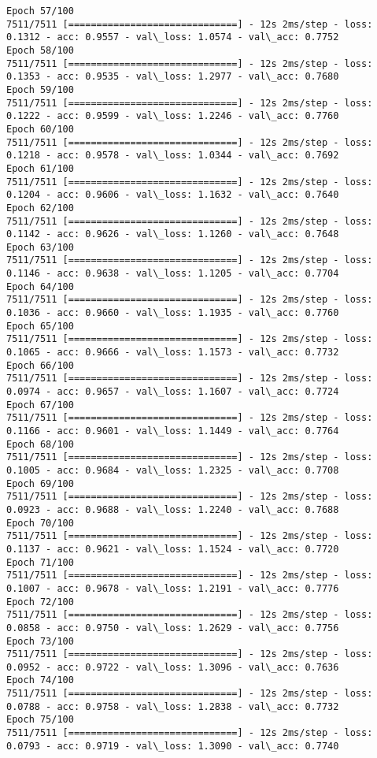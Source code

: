 \documentclass[11pt]{article}
\begin{document}
\begin{Verbatim}[commandchars=\\\{\}]
Epoch 57/100
7511/7511 [==============================] - 12s 2ms/step - loss: 0.1312 - acc: 0.9557 - val\_loss: 1.0574 - val\_acc: 0.7752
Epoch 58/100
7511/7511 [==============================] - 12s 2ms/step - loss: 0.1353 - acc: 0.9535 - val\_loss: 1.2977 - val\_acc: 0.7680
Epoch 59/100
7511/7511 [==============================] - 12s 2ms/step - loss: 0.1222 - acc: 0.9599 - val\_loss: 1.2246 - val\_acc: 0.7760
Epoch 60/100
7511/7511 [==============================] - 12s 2ms/step - loss: 0.1218 - acc: 0.9578 - val\_loss: 1.0344 - val\_acc: 0.7692
Epoch 61/100
7511/7511 [==============================] - 12s 2ms/step - loss: 0.1204 - acc: 0.9606 - val\_loss: 1.1632 - val\_acc: 0.7640
Epoch 62/100
7511/7511 [==============================] - 12s 2ms/step - loss: 0.1142 - acc: 0.9626 - val\_loss: 1.1260 - val\_acc: 0.7648
Epoch 63/100
7511/7511 [==============================] - 12s 2ms/step - loss: 0.1146 - acc: 0.9638 - val\_loss: 1.1205 - val\_acc: 0.7704
Epoch 64/100
7511/7511 [==============================] - 12s 2ms/step - loss: 0.1036 - acc: 0.9660 - val\_loss: 1.1935 - val\_acc: 0.7760
Epoch 65/100
7511/7511 [==============================] - 12s 2ms/step - loss: 0.1065 - acc: 0.9666 - val\_loss: 1.1573 - val\_acc: 0.7732
Epoch 66/100
7511/7511 [==============================] - 12s 2ms/step - loss: 0.0974 - acc: 0.9657 - val\_loss: 1.1607 - val\_acc: 0.7724
Epoch 67/100
7511/7511 [==============================] - 12s 2ms/step - loss: 0.1166 - acc: 0.9601 - val\_loss: 1.1449 - val\_acc: 0.7764
Epoch 68/100
7511/7511 [==============================] - 12s 2ms/step - loss: 0.1005 - acc: 0.9684 - val\_loss: 1.2325 - val\_acc: 0.7708
Epoch 69/100
7511/7511 [==============================] - 12s 2ms/step - loss: 0.0923 - acc: 0.9688 - val\_loss: 1.2240 - val\_acc: 0.7688
Epoch 70/100
7511/7511 [==============================] - 12s 2ms/step - loss: 0.1137 - acc: 0.9621 - val\_loss: 1.1524 - val\_acc: 0.7720
Epoch 71/100
7511/7511 [==============================] - 12s 2ms/step - loss: 0.1007 - acc: 0.9678 - val\_loss: 1.2191 - val\_acc: 0.7776
Epoch 72/100
7511/7511 [==============================] - 12s 2ms/step - loss: 0.0858 - acc: 0.9750 - val\_loss: 1.2629 - val\_acc: 0.7756
Epoch 73/100
7511/7511 [==============================] - 12s 2ms/step - loss: 0.0952 - acc: 0.9722 - val\_loss: 1.3096 - val\_acc: 0.7636
Epoch 74/100
7511/7511 [==============================] - 12s 2ms/step - loss: 0.0788 - acc: 0.9758 - val\_loss: 1.2838 - val\_acc: 0.7732
Epoch 75/100
7511/7511 [==============================] - 12s 2ms/step - loss: 0.0793 - acc: 0.9719 - val\_loss: 1.3090 - val\_acc: 0.7740

\end{Verbatim}
\end{document}
